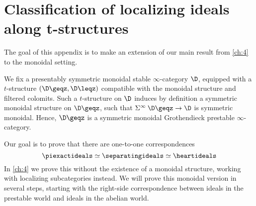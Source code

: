

\section{Classification of localizing ideals along t-structures}
\label{app:A}

The goal of this appendix is to make an extension of our main result from \cref{ch:4} to the monoidal setting. 

We fix a presentably symmetric monoidal stable $\infty$-category $\D$, equipped with a $t$-structure $(\D\geqz, \D\leqz)$ compatible with the monoidal structure and filtered colomits. Such a $t$-structure on $\D$ induces by definition a symmetric monoidal structure on $\D\geqz$, such that $\Sigma^\infty\: \D\geqz\to \D$ is symmetric monoidal. Hence, $\D\geqz$ is a symmetric monoidal Grothendieck prestable $\infty$-category. 

Our goal is to prove that there are one-to-one correspondences
\[\piexactideals \simeq \separatingideals \simeq \heartideals\]
In \cref{ch:4} we prove this without the existence of a monoidal structure, working with localizing subcategories instead. We will prove this monoidal version in several steps, starting with the right-side correspondence between ideals in the prestable world and ideals in the abelian world. 

